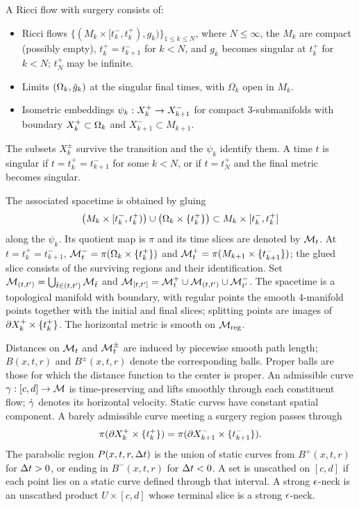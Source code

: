 \begin{definition}
  \label{def:kl-ricci-flow-surgery-general-setting-ricci-flow-surgery-definition}
  \label{flowwithsurgery}
A Ricci flow with surgery consists of:

\begin{itemize}
\item Ricci flows $\{(M_k\times[t_k^-,t_k^+),g_k) \}_{1\leq k\leq N}$,
where $N\leq\infty$, the $M_k$ are compact (possibly empty),
$t_k^+=t_{k+1}^-$ for $k<N$, and $g_k$ becomes singular at $t_k^+$ for
$k<N$; $t_N^+$ may be infinite.
\item Limits $(\Omega_k,\bar g_k)$ at the singular final times, with
$\Omega_k$ open in $M_k$.
\item Isometric embeddings
$\psi_k:X_k^+\rightarrow X_{k+1}^-$ for compact $3$-submanifolds with boundary
$X_k^+\subset\Omega_k$ and $X_{k+1}^-\subset M_{k+1}$.
\end{itemize}
The subsets $X_k^\pm$ survive the transition and the $\psi_k$ identify
them. A time $t$ is singular if $t=t_k^+=t_{k+1}^-$ for some $k<N$, or
if $t=t_N^+$ and the final metric becomes singular.
\end{definition}

The associated spacetime is obtained by gluing
\begin{equation}
\left(M_k\times [t_k^-,t_k^+)\right)\cup
\left(\Omega_k\times\{t_k^+\}\right)
\subset M_k\times[t_k^-,t_k^+]
\end{equation}
along the $\psi_k$. Its quotient map is $\pi$ and its time slices are
denoted by ${\mathcal M}_t$. At $t=t_k^+=t_{k+1}^-$,
${\mathcal M}_t^- = \pi(\Omega_k\times\{t_k^+\})$ and
${\mathcal M}_t^+ = \pi(M_{k+1}\times\{t_{k+1}^-\})$; the glued slice consists of
the surviving regions and their identification. Set
${\mathcal M}_{(t,t')}=\bigcup_{\bar t\in(t,t')}{\mathcal M}_{\bar t}$ and
${\mathcal M}_{[t,t']}={\mathcal M}_t^+\cup{\mathcal M}_{(t,t')}\cup{\mathcal M}_{t'}^-$. The spacetime is a
topological manifold with boundary, with regular points the smooth
$4$-manifold points together with the initial and final slices; splitting
points are images of $\partial X_k^+\times\{t_k^+\}$. The horizontal metric is
smooth on ${\mathcal M}_{\operatorname{reg}}$.

Distances on ${\mathcal M}_t$ and ${\mathcal M}_t^\pm$ are induced by piecewise smooth path
length; $B(x,t,r)$ and $B^\pm(x,t,r)$ denote the corresponding balls.
Proper balls are those for which the distance function to the center is
proper. An admissible curve $\gamma:[c,d]\rightarrow{\mathcal M}$ is time-preserving and lifts
smoothly through each constituent flow; $\dot{\gamma}$ denotes its horizontal
velocity. Static curves have constant spatial component. A barely admissible
curve meeting a surgery region passes through
\begin{equation}
\pi(\partial X_k^+\times\{t_k^+\})
=\pi(\partial X_{k+1}^-\times\{t_{k+1}^-\}).
\end{equation}
The parabolic region $P(x,t,r,\Delta t)$ is the union of static curves from
$B^+(x,t,r)$ for $\Delta t>0$, or ending in $B^-(x,t,r)$ for $\Delta t<0$.
A set is unscathed on $[c,d]$ if each point lies on a static curve defined
through that interval. A strong $\epsilon$-neck is an unscathed product
$U\times[c,d]$ whose terminal slice is a strong $\epsilon$-neck.

